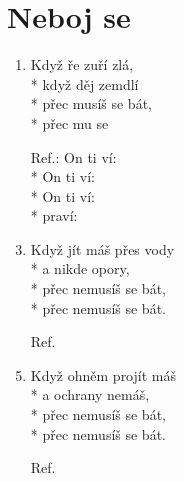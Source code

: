 \section{Neboj se}
\begin{enumerate}
\item	Když ře zuří zlá,\\*
  	když děj zemdlí\\*
	přec musíš se bát,\\*
	přec mu se 
\item[Ref.:] 	On ti ví: \\*
	On ti ví: \\*
	On ti ví: \\*
	praví: 
\item	Když jít máš přes vody\\*
	a nikde opory,\\*
	přec nemusíš se bát,\\*
	přec nemusíš se bát.  
\item[Ref.]

\item	Když ohněm projít máš\\*
	a ochrany nemáš,\\*
	přec nemusíš se bát,\\* 
	přec nemusíš se bát. 
\item[Ref.]
\end{enumerate}
